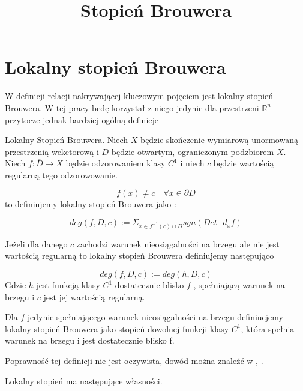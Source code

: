 \title{Stopień Brouwera}

\section{Lokalny stopień Brouwera}

W definicji relacji nakrywającej kluczowym pojęciem jest lokalny stopień Brouwera.
W tej pracy bedę korzystał z niego jedynie dla przestrzeni $ \mathbb R^n $ 
przytocze jednak bardziej ogólną definicje

\begin{definition} {Lokalny Stopień Brouwera.}
  Niech $X$ będzie skończenie wymiarową unormowaną przestrzenią weketorową i $ D $ będzie otwartym, ograniczonym podzbiorem $ X $.
  Niech $ f : \overline D \to X $ będzie odzorowaniem klasy $ C^1 $ i niech $c$ będzie wartością regularną tego odzorowowanie. 
  
  \begin{equation}
    f(x) \neq c  \quad \forall x \in \partial D 
  \end{equation}
to definiujemy lokalny stopień Brouwera jako : 
  
  \begin{equation}
    deg(f,D,c) := \Sigma_{x \in f^{-1}(c)\cap D} sgn(Det \mbox{ } d_x f)
  \end{equation}
  
  Jeżeli dla danego $ c $ zachodzi warunek nieosiągalności na brzegu ale nie jest wartością regularną to lokalny stopień Brouwera
  definiujemy następująco
  
    \begin{equation}
      deg(f,D,c) := deg(h,D,c)
    \end{equation}
    Gdzie $h$ jest funkcją klasy $ C^1 $ dostatecznie blisko $f$ , spełniającą warunek na brzegu i $ c $ jest jej wartością regularną.
    
    Dla $ f $ jedynie spełniającego warunek nieosiągalności na brzegu definiuejemy lokalny stopień Brouwera jako stopień 
    dowolnej funkcji klasy $ C^1 $, która spełnia warunek na brzegu i jest dostatecznie blisko f.
  

\end{definition}

Poprawność tej definicji nie jest oczywista, dowód można znaleźć w \cite{N} , \cite{Sch}.

Lokalny stopień ma następujące własności.

